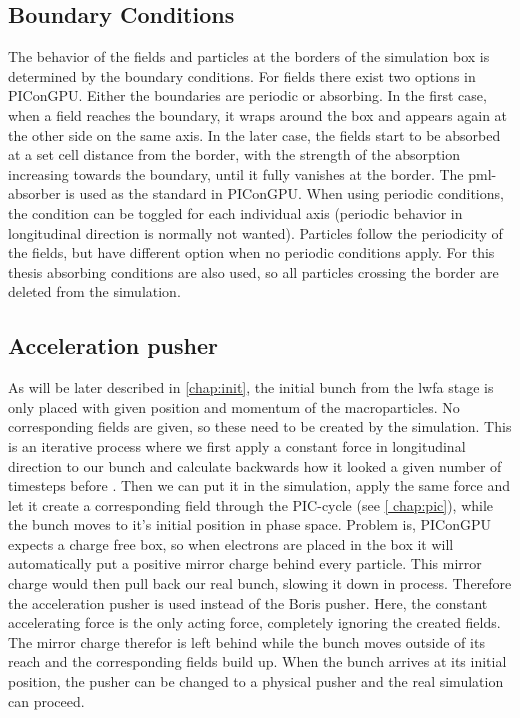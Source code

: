 \documentclass[bachelor_thesis]{subfiles}
\begin{document}
\subsection{Boundary Conditions}
The behavior of the fields and particles at the borders of the simulation box is determined by the boundary conditions.
For fields there exist two options in PIConGPU. Either the boundaries are periodic or absorbing. In the first case, when a field reaches the boundary, it wraps around the box and appears again at the other side on the same axis.
In the later case, the fields start to be absorbed at a set cell distance from the border, with the strength of the absorption increasing towards the boundary, until it fully vanishes at the border.
The \gls{pml}-absorber is used as the standard in PIConGPU. When using periodic conditions, the condition can be toggled for each individual axis (periodic behavior in longitudinal direction is normally not wanted).
Particles follow the periodicity of the fields, but have different option when no periodic conditions apply. For this thesis absorbing conditions are also used, so all particles crossing the border are deleted from the simulation.

\subsection{Acceleration pusher} \label{chap:accpush}
As will be later described in \autoref{chap:init}, the initial bunch from the \gls{lwfa} stage is only placed with given position and momentum of the macroparticles.
No corresponding fields are given, so these need to be created by the simulation. This is an iterative process where we first apply a constant force in longitudinal direction to our bunch and calculate backwards how it looked a given number of timesteps before \cite{Huebl2014}.
Then we can put it in the simulation, apply the same force and let it create a corresponding field through the PIC-cycle (see \autoref{	chap:pic}), while the bunch moves to it's initial position in phase space. 
Problem is, PIConGPU expects a charge free box, so when electrons are placed in the box it will automatically put a positive mirror charge behind every particle. This mirror charge would then pull back our real 
bunch, slowing it down in process. Therefore the acceleration pusher is used instead of the Boris pusher. Here, the constant accelerating force is the only acting force, completely ignoring the created fields.
The mirror charge therefor is left behind while the bunch moves outside of its reach and the corresponding fields build up. When the bunch arrives at its initial position, the pusher can be changed to a physical pusher and
the real simulation can proceed.
\end{document}
